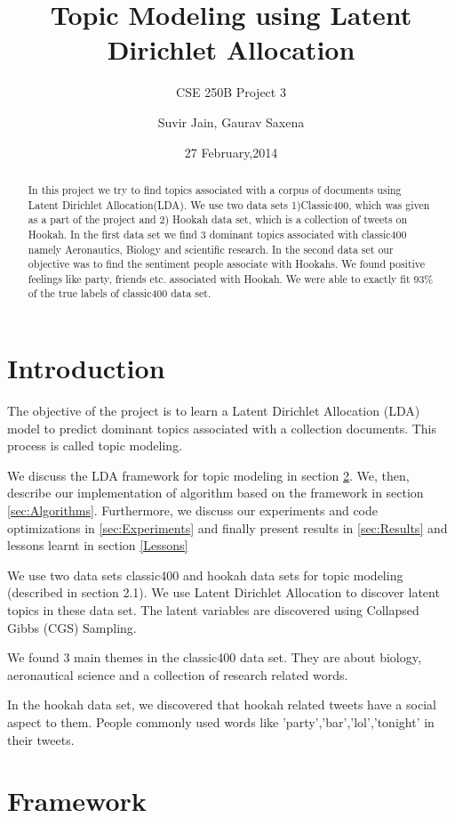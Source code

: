 \documentclass[11pt,a4paper,oneside]{article}
\title{Topic Modeling using Latent Dirichlet Allocation}
\subtitle{CSE 250B Project 3}
\author{Suvir Jain, Gaurav Saxena}
\date{27 February,2014}
\begin{document}
\maketitle

\begin{abstract}
In this project we try to find topics associated with a corpus of documents using Latent Dirichlet Allocation(LDA). We use two data sets 1)Classic400, which was given as a part of the project and 2) Hookah data set, which is a collection of tweets on Hookah. In the first data set we find 3 dominant topics associated with classic400 namely Aeronautics, Biology and scientific research. In the second data set our objective was to find the sentiment people associate with Hookahs. We found positive feelings like party, friends etc. associated with Hookah. We were able to exactly fit 93\% of the true labels of classic400 data set.
\end{abstract}

\section{Introduction}

The objective of the project is to learn a Latent Dirichlet Allocation (LDA) model to predict dominant topics associated with a collection documents. This process is called topic modeling.

We discuss the LDA framework for topic modeling in section \ref{sec:Framework}. We, then, describe our implementation of algorithm based on the framework in section \ref{sec:Algorithms}. Furthermore, we discuss our experiments and code optimizations in \ref{sec:Experiments} and finally present results in \ref{sec:Results} and lessons learnt in section \ref{Lessons}

We use two data sets classic400 and hookah data sets for topic modeling (described in section 2.1). We use Latent Dirichlet Allocation to discover latent topics in these data set. The latent variables are discovered using Collapsed Gibbs (CGS) Sampling.

We found 3 main themes in the classic400 data set. They are about biology, aeronautical science and a collection of research related words. 

In the hookah data set, we discovered that hookah related tweets have a social aspect to them. People commonly used words like 'party','bar','lol','tonight'  in their tweets.

\section{Framework}
\label{sec:Framework}
\end{document}
